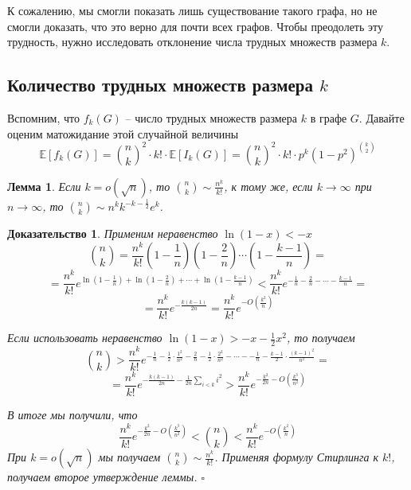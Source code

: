 \documentclass[a4paper]{article}
\newtheorem*{msolution}{Доказательство}
\newtheorem{mlemma}{Лемма}[section]
\begin{document}
К сожалению, мы смогли показать лишь существование такого графа, но не смогли доказать, что это верно 
для почти всех графов. Чтобы преодолеть эту трудность, нужно исследовать отклонение числа трудных множеств 
размера $k$.

\subsection{Количество трудных множеств размера $k$}

Вспомним, что $f_k(G)$ -- число трудных множеств размера $k$ в графе $G$. Давайте оценим 
матожидание этой случайной величины $$\mathbb{E}[f_k(G)] = \binom{n}{k}^2\cdot k!\cdot \mathbb{E}[I_k(G)] = 
\binom{n}{k}^2\cdot k!\cdot p^k(1-p^2)^{\binom{k}{2}}$$

\begin{mlemma}
    Если $k = o(\sqrt{n})$, то $\binom{n}{k} \sim \frac{n^k}{k!}$, к тому же, если $k \rightarrow \infty$ 
    при $n \rightarrow \infty$, то $\binom{n}{k} \sim n^k k^{-k-\frac{1}{2}}e^k$.
\end{mlemma}

\begin{msolution}
    Применим неравенство $\ln(1-x) < -x$ $$\binom{n}{k} = \frac{n^k}{k!}\left(1-\frac{1}{n}\right)
    \left(1-\frac{2}{n}\right)\cdots\left(1-\frac{k-1}{n}\right) = $$ $$ = \frac{n^k}{k!}e^{\ln\left(1-\frac{1}{n}\right) + 
    \ln\left(1-\frac{2}{n}\right) + \cdots + \ln\left(1-\frac{k-1}{n}\right)} < \frac{n^k}{k!}e^{-\frac{1}{n} -
    \frac{2}{n}-\cdots -\frac{k-1}{n}} = $$ $$ = \frac{n^k}{k!}e^{-\frac{k(k-1)}{2n}} = \frac{n^k}{k!}e^{-O\left(\frac{k^2}{n}\right)}$$
    
    Если использовать неравенство $\ln(1-x) > -x - \frac{1}{2}x^2$, то получаем $$\binom{n}{k} > 
    \frac{n^k}{k!}e^{-\frac{1}{n} - \frac{1}{2}\cdot\frac{1^2}{n^2} - \frac{2}{n} - \frac{1}{2}\cdot\frac{2^2}{n^2} - 
    \cdots - -\frac{1}{n} - \frac{k-1}{2}\cdot\frac{(k-1)^2}{n^2}} = $$ $$ = \frac{n^k}{k!}e^{-\frac{k(k-1)}{2n}-
    \frac{1}{2n}\sum\limits_{i<k}i^2}  > \frac{n^k}{k!}e^{-\frac{k^2}{2n}-O\left(\frac{k^3}{n^2}\right)}$$
    
    В итоге мы получили, что $$\frac{n^k}{k!}e^{-\frac{k^2}{2n}-O\left(\frac{k^3}{n^2}\right)} < \binom{n}{k} < 
    \frac{n^k}{k!}e^{-O\left(\frac{k^2}{n}\right)}$$ При $k = o(\sqrt{n})$ мы получаем $\binom{n}{k} \sim \frac{n^k}{k!}$.
    Применяя формулу Стирлинга к $k!$, получаем второе утверждение леммы. $\square$
\end{msolution}
    
\end{document}

